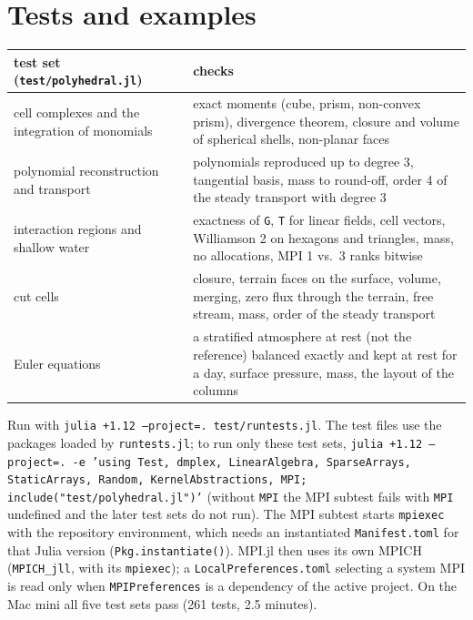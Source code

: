 \documentclass[11pt,a4paper]{article}
\newcommand{\code}[1]{\texttt{#1}}
\begin{document}
\section{Tests and examples}

\begin{table}[h]
\centering\small
\begin{tabular}{p{}p{}}
\toprule
test set (\code{test/polyhedral.jl}) & checks \\
\midrule
cell complexes and the integration of monomials & exact moments (cube, prism, non-convex prism), divergence theorem, closure and volume of spherical shells, non-planar faces \\
polynomial reconstruction and transport & polynomials reproduced up to degree 3, tangential basis, mass to round-off, order 4 of the steady transport with degree 3 \\
interaction regions and shallow water & exactness of \code{G}, \code{T} for linear fields, cell vectors, Williamson 2 on hexagons and triangles, mass, no allocations, MPI 1 vs.\ 3 ranks bitwise \\
cut cells & closure, terrain faces on the surface, volume, merging, zero flux through the terrain, free stream, mass, order of the steady transport \\
Euler equations & a stratified atmosphere at rest (not the reference) balanced exactly and kept at rest for a day, surface pressure, mass, the layout of the columns \\
\bottomrule
\end{tabular}
\end{table}

Run with \code{julia +1.12 --project=. test/runtests.jl}. The test files use the packages loaded by
\code{runtests.jl}; to run only these test sets,
\code{julia +1.12 --project=. -e 'using Test, dmplex, LinearAlgebra, SparseArrays, StaticArrays, Random,
KernelAbstractions, MPI; include("test/polyhedral.jl")'} (without \code{MPI} the MPI subtest fails with
\code{MPI} undefined and the later test sets do not run). The MPI subtest starts \code{mpiexec} with the
repository environment, which needs an instantiated \code{Manifest.toml} for that Julia version
(\code{Pkg.instantiate()}). MPI.jl then uses its own MPICH (\code{MPICH\_jll}, with its \code{mpiexec});
a \code{LocalPreferences.toml} selecting a system MPI is read only when \code{MPIPreferences} is a
dependency of the active project. On the Mac mini all five test sets pass (261 tests, 2.5 minutes).
\end{document}
